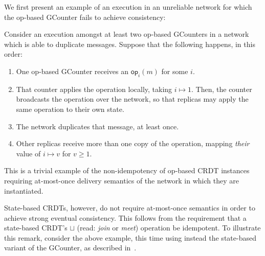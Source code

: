 We first present an example of an execution in an unreliable network for which
the op-based GCounter fails to achieve consistency:
\begin{example}
  Consider an execution amongst at least two op-based GCounters in a network
  which is able to duplicate messages. Suppose that the following happens, in
  this order:
  \begin{enumerate}
    \item One op-based GCounter receives an $\mathsf{op}_i(m)$ for some $i$.
    \item That counter applies the operation locally, taking $i \mapsto 1$. Then,
      the counter broadcasts the operation over the network, so that replicas may
      apply the same operation to their own state.
    \item The network duplicates that message, at least once.
    \item Other replicas receive more than one copy of the operation, mapping
      \textit{their} value of $i \mapsto v$ for $v \ge 1$.
  \end{enumerate}
  This is a trivial example of the non-idempotency of op-based CRDT instances
  requiring at-most-once delivery semantics of the network in which they are
  instantiated.
\end{example}

State-based CRDTs, however, do not require at-most-once semantics in order to
achieve strong eventual consistency. This follows from the requirement that a
state-based CRDT's $\sqcup$ (read: \textit{join} or \textit{meet}) operation be
idempotent. To illustrate this remark, consider the above example, this time
using instead the state-based variant of the GCounter, as described
in~\citep{almedia18}.

